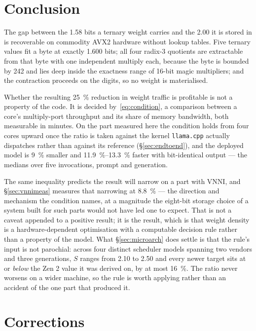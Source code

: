 \documentclass[11pt,a4paper]{article}
\newcommand{\code}[1]{\texttt{#1}}
\begin{document}
\section{Conclusion}

The gap between the \num{1.58} bits a ternary weight carries and the \num{2.00}
it is stored in is recoverable on commodity AVX2 hardware without lookup tables.
Five ternary values fit a byte at exactly \num{1.600} bits; all four radix-3
quotients are extractable from that byte with one independent multiply each,
because the byte is bounded by \num{242} and lies deep inside the exactness range
of 16-bit magic multipliers; and the contraction proceeds on the digits, so no
weight is materialised.

Whether the resulting \SI{25}{\percent} reduction in weight traffic is
profitable is not a property of the code. It is decided
by~\eqref{eq:condition}, a comparison between a core's multiply-port throughput
and its share of memory bandwidth, both measurable in minutes. On the part
measured here the condition holds from four cores upward once the ratio is taken
against the kernel \code{llama.cpp} actually dispatches rather than against its
reference (\S\ref{sec:endtoend}), and the deployed model
is \SI{9}{\percent} smaller and \SIrange{11.9}{13.3}{\percent} faster with
bit-identical output --- the medians over five invocations, prompt and
generation.

The same inequality predicts the result will narrow on a part with VNNI, and
\S\ref{sec:vnnimeas} measures that narrowing at \SI{8.8}{\percent} --- the
direction and mechanism the condition names, at a magnitude the eight-bit
storage choice of a system built for such parts would not have led one to
expect. That is not a caveat appended to a positive result; it is the result,
which is that weight density is a hardware-dependent optimisation with a
computable decision rule rather than a property of the model. What
\S\ref{sec:microarch} does settle is that the rule's input is not parochial:
across four distinct scheduler models spanning two vendors and three
generations, $S$ ranges from \num{2.10} to \num{2.50} and every newer target
sits at or \emph{below} the Zen 2 value it was derived on, by at most
\SI{16}{\percent}. The ratio never worsens on a wider machine, so the rule is
worth applying rather than an accident of the one part that produced it.

\section*{Corrections}
\end{document}
